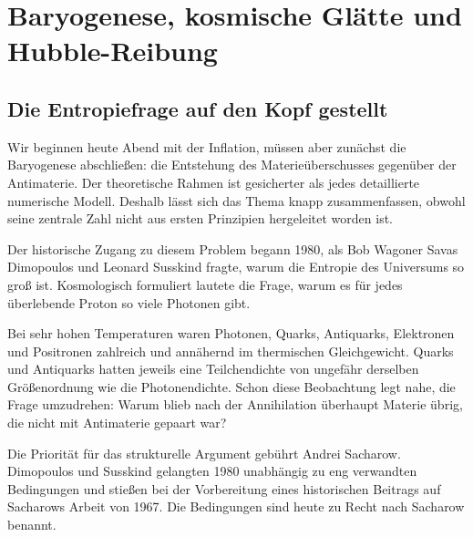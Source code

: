 \chapter{Baryogenese, kosmische Glätte und Hubble-Reibung}


\section{Die Entropiefrage auf den Kopf gestellt}

Wir beginnen heute Abend mit der Inflation, müssen aber zunächst die Baryogenese abschließen: die Entstehung des Materieüberschusses gegenüber der Antimaterie. Der theoretische Rahmen ist gesicherter als jedes detaillierte numerische Modell. Deshalb lässt sich das Thema knapp zusammenfassen, obwohl seine zentrale Zahl nicht aus ersten Prinzipien hergeleitet worden ist.

Der historische Zugang zu diesem Problem begann 1980, als Bob Wagoner Savas Dimopoulos und Leonard Susskind fragte, warum die Entropie des Universums so groß ist. Kosmologisch formuliert lautete die Frage, warum es für jedes überlebende Proton so viele Photonen gibt.

Bei sehr hohen Temperaturen waren Photonen, Quarks, Antiquarks, Elektronen und Positronen zahlreich und annähernd im thermischen Gleichgewicht. Quarks und Antiquarks hatten jeweils eine Teilchendichte von ungefähr derselben Größenordnung wie die Photonendichte. Schon diese Beobachtung legt nahe, die Frage umzudrehen: Warum blieb nach der Annihilation überhaupt Materie übrig, die nicht mit Antimaterie gepaart war?

Die Priorität für das strukturelle Argument gebührt Andrei Sacharow. Dimopoulos und Susskind gelangten 1980 unabhängig zu eng verwandten Bedingungen und stießen bei der Vorbereitung eines historischen Beitrags auf Sacharows Arbeit von 1967. Die Bedingungen sind heute zu Recht nach Sacharow benannt.

